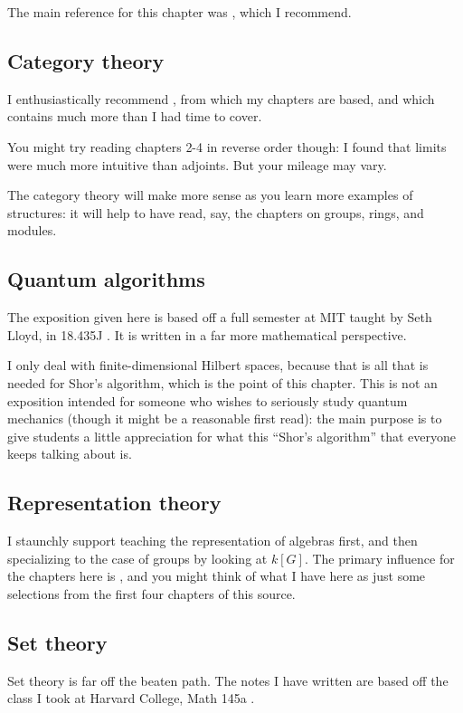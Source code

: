 The main reference for this chapter was \cite{ref:dartmouth}, which I recommend.

\subsection*{Category theory}
I enthusiastically recommend \cite{ref:msci},
from which my chapters are based,
and which contains much more than I had time to cover.

You might try reading chapters {2-4} in reverse order though:
I found that limits were much more intuitive than adjoints.
But your mileage may vary.

The category theory will make more sense as you learn
more examples of structures: it will help to have read,
say, the chapters on groups, rings, and modules.

\subsection*{Quantum algorithms}
The exposition given here is based off a full semester
at MIT taught by Seth Lloyd, in 18.435J \cite{ref:18-435}.
It is written in a far more mathematical perspective.

I only deal with finite-dimensional Hilbert spaces,
because that is all that is needed for Shor's algorithm,
which is the point of this chapter.
This is not an exposition intended for someone who wishes to seriously
study quantum mechanics (though it might be a reasonable first read):
the main purpose is to give students a little appreciation for
what this ``Shor's algorithm'' that everyone keeps talking about is.

\subsection*{Representation theory}
I staunchly support teaching the representation of algebras first,
and then specializing to the case of groups by looking at $k[G]$.
The primary influence for the chapters here is \cite{ref:etingof},
and you might think of what I have here as just some selections
from the first four chapters of this source.

\subsection*{Set theory}
Set theory is far off the beaten path.
The notes I have written are based off the class
I took at Harvard College, Math 145a \cite{ref:145a}.

